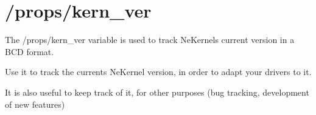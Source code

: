 \chapter{/props/kern\+\_\+ver}
\hypertarget{md_dev_2boot_2src_2docs_2_k_e_r_n___v_e_r}{}\label{md_dev_2boot_2src_2docs_2_k_e_r_n___v_e_r}
\label{md_dev_2boot_2src_2docs_2_k_e_r_n___v_e_r_autotoc_md0}%
%
 The {\ttfamily /props/kern\+\_\+ver} variable is used to track Ne\+Kernel\textquotesingle{}s current version in a BCD format.


\begin{DoxyItemize}
\item Use it to track the current\textquotesingle{}s Ne\+Kernel version, in order to adapt your drivers to it.
\item It is also useful to keep track of it, for other purposes (bug tracking, development of new features) 
\end{DoxyItemize}